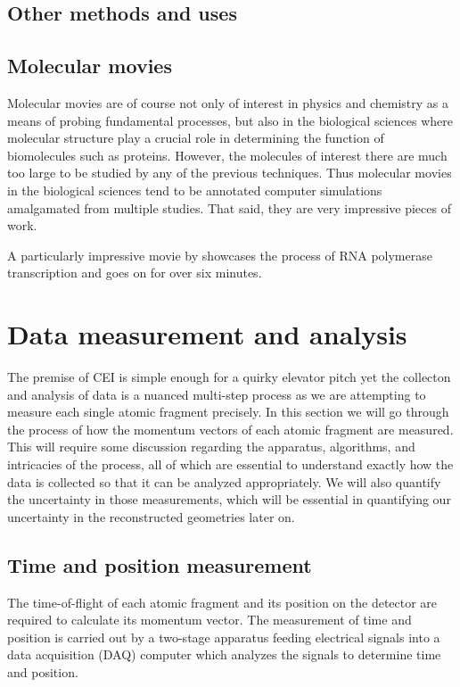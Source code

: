 \subsection{Other methods and uses}

\subsection{Molecular movies}
Molecular movies are of course not only of interest in physics and chemistry as a means of probing fundamental processes, but also in the biological sciences where molecular structure play a crucial role in determining the function of biomolecules such as proteins. However, the molecules of interest there are much too large to be studied by any of the previous techniques. Thus molecular movies in the biological sciences tend to be annotated computer simulations amalgamated from multiple studies. That said, they are very impressive pieces of work.

A particularly impressive movie by \citet{Cheung12} showcases the process of RNA polymerase transcription and goes on for over six minutes.

\section{Data measurement and analysis}
The premise of CEI is simple enough for a quirky elevator pitch yet the collecton and analysis of data is a nuanced multi-step process as we are attempting to measure each single atomic fragment precisely. In this section we will go through the process of how the momentum vectors of each atomic fragment are measured. This will require some discussion regarding the apparatus, algorithms, and intricacies of the process, all of which are essential to understand exactly how the data is collected so that it can be analyzed appropriately. We will also quantify the uncertainty in those measurements, which will be essential in quantifying our uncertainty in the reconstructed geometries later on.

\subsection{Time and position measurement}
The time-of-flight of each atomic fragment and its position on the detector are required to calculate its momentum vector. The measurement of time and position is carried out by a two-stage apparatus feeding electrical signals into a data acquisition (DAQ) computer which analyzes the signals to determine time and position.

